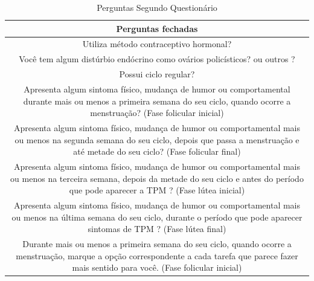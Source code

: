 \begin{table}[ht]
    \centering
    \caption{Perguntas Segundo Questionário}
    \label{tab10}
    \begin{tabular}{c}
        \toprule
        \textbf{Perguntas fechadas} \\
        \midrule
        \begin{minipage} [t] {1\textwidth} Utiliza método contraceptivo hormonal?  \end{minipage} \\
        \midrule
        \begin{minipage} [t] {1\textwidth} Você tem algum distúrbio endócrino como ovários policísticos? ou outros ? \end{minipage}\\
        \midrule
        \begin{minipage} [t] {1\textwidth} Possui ciclo regular? \end{minipage} \\
        \midrule
        \begin{minipage} [t] {1\textwidth} Apresenta algum sintoma físico, mudança de humor ou comportamental durante mais ou menos a primeira semana do seu ciclo, quando ocorre a menstruação? (Fase folicular inicial) \end{minipage}  \\
        \midrule
        \begin{minipage} [t] {1\textwidth} Apresenta algum sintoma físico, mudança de humor ou comportamental mais ou menos na segunda semana do seu ciclo, depois que passa a menstruação e até metade do seu ciclo? (Fase folicular final)\end{minipage}\\
        \midrule
        \begin{minipage} [t] {1\textwidth} Apresenta algum sintoma físico, mudança de humor ou comportamental mais ou menos na terceira semana, depois da metade do seu ciclo e antes do período que pode aparecer a TPM ? (Fase lútea inicial)\end{minipage} \\
        \midrule
        \begin{minipage} [t] {1\textwidth} Apresenta algum sintoma físico, mudança de humor ou comportamental mais ou menos na última semana do seu ciclo, durante o período que pode aparecer sintomas de TPM ? (Fase lútea final)\end{minipage}\\
        \midrule
        \begin{minipage} [t] {1\textwidth} Durante mais ou menos a primeira semana do seu ciclo, quando ocorre a menstruação, marque a opção correspondente a cada tarefa que parece fazer mais sentido para você. (Fase folicular inicial) \end{minipage}\\

\end{tabular}
\end{table}
